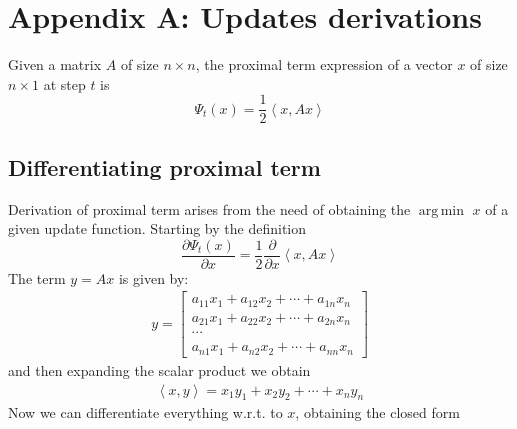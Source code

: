 \documentclass[notitlepage]{article}
\DeclareMathOperator*{\argmin}{arg\,min}
\begin{document}
\newpage




\newpage

\appendix

\section{Appendix A: Updates derivations}
\label{sec:appendix}
Given a matrix $A$ of size $n \times n$, the proximal term expression of a vector $x$ of size $n\times 1$ at step $t$ is
\[
  \Psi_t(x) = \frac{1}{2} \left\langle x, A x \right\rangle  
\]

\subsection{Differentiating proximal term}
Derivation of proximal term arises from the need of obtaining the $\argmin$ $x$ of a given update function. Starting by the definition
\[
  \frac{\partial \Psi_t(x)}{\partial x} = \frac{1}{2} \frac{\partial}{\partial x} \left\langle x, A x \right\rangle  
\]
The term $y = A x$ is given by:
\begin{align*}
  y = 
  \begin{bmatrix}
    a_{11}x_1 + a_{12}x_2 + \cdots + a_{1n}x_n \\[2ex]
    a_{21}x_1 + a_{22}x_2 + \cdots + a_{2n}x_n \\[2ex]
    \cdots \\
    a_{n1}x_1 + a_{n2}x_2 + \cdots + a_{nn}x_n 
  \end{bmatrix}
\end{align*}
and then expanding the scalar product we obtain
\begin{align*}
  \left\langle x,y \right\rangle = x_1 y_1 + x_2 y_2 + \cdots + x_n y_n
\end{align*}
Now we can differentiate everything w.r.t. to $x$, obtaining the closed form
\end{document}
